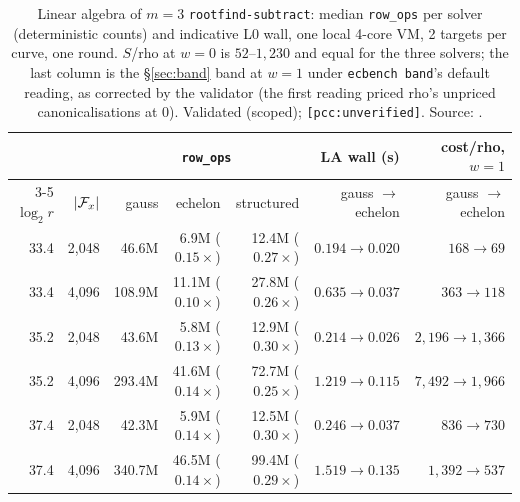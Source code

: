 \begin{table}[t]
\centering\small
\begin{tabular}{@{}rrrrrrr@{}}
\toprule
& & \multicolumn{3}{c}{\texttt{row\_ops}} & LA wall (s) & cost/rho, $w=1$ \\
\cmidrule(lr){3-5}
$\log_2r$ & $\lvert \mathcal{F}_x \rvert$ & gauss & echelon & structured & gauss $\to$ echelon & gauss $\to$ echelon \\
\midrule
33.4 & 2{,}048 & 46.6M & 6.9M ($0.15\times$) & 12.4M ($0.27\times$) & $0.194\to0.020$ & $168\to69$ \\
33.4 & 4{,}096 & 108.9M & 11.1M ($0.10\times$) & 27.8M ($0.26\times$) & $0.635\to0.037$ & $363\to118$ \\
35.2 & 2{,}048 & 43.6M & 5.8M ($0.13\times$) & 12.9M ($0.30\times$) & $0.214\to0.026$ & $2{,}196\to1{,}366$ \\
35.2 & 4{,}096 & 293.4M & 41.6M ($0.14\times$) & 72.7M ($0.25\times$) & $1.219\to0.115$ & $7{,}492\to1{,}966$ \\
37.4 & 2{,}048 & 42.3M & 5.9M ($0.14\times$) & 12.5M ($0.30\times$) & $0.246\to0.037$ & $836\to730$ \\
37.4 & 4{,}096 & 340.7M & 46.5M ($0.14\times$) & 99.4M ($0.29\times$) & $1.519\to0.135$ & $1{,}392\to537$ \\
\bottomrule
\end{tabular}
\caption[]{Linear algebra of $m=3$ \texttt{rootfind-subtract}: median
\texttt{row\_ops} per solver (deterministic counts) and indicative L0 wall,
one local 4-core VM, 2 targets per curve, one round. $S$/rho at $w=0$ is
$52$--$1{,}230$ and equal for the three solvers; the last column is the
\S\ref{sec:band} band at $w=1$ under \texttt{ecbench band}'s default
reading, as corrected by the validator (the first reading priced rho's
unpriced canonicalisations at 0). Validated (scoped);
\texttt{[pcc:unverified]}. Source:
.}
\label{tab:rf-la-m3}
\end{table}

